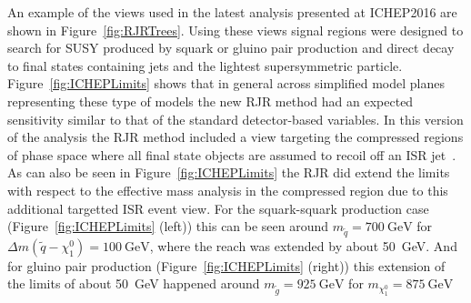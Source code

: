 An example of the views used in the latest analysis presented at
ICHEP2016 are shown in Figure~\ref{fig:RJRTrees}.  Using these views
signal regions were designed to search for SUSY produced by squark or
gluino pair production and direct decay to final states containing
jets and the lightest supersymmetric particle.
Figure~\ref{fig:ICHEPLimits} shows that in general across simplified
model planes representing these type of models the new RJR method had
an expected sensitivity similar to that of the standard detector-based
variables.  In this version of the analysis the RJR method included a
view targeting the compressed regions of phase space where all final
state objects are assumed to recoil off an ISR
jet~\cite{Jackson:2016mfb}.  As can also be seen in
Figure~\ref{fig:ICHEPLimits} the RJR did extend the limits with
respect to the effective mass analysis in the compressed region due to
this additional targetted ISR event view.  For the squark-squark
production case (Figure~\ref{fig:ICHEPLimits} (left)) this can be seen
around $m_{\tilde{q}} = 700~\mathrm{GeV}$ for $\Delta m(\tilde{q} -
\chi_1^0) = 100~\mathrm{GeV}$, where the reach was extended by about
50~GeV.  And for gluino pair production (Figure~\ref{fig:ICHEPLimits}
(right)) this extension of the limits of about 50~GeV happened around
$m_{\tilde{g}} = 925~\mathrm{GeV}$ for $m_{\chi_1^0} =
875~\mathrm{GeV}$



